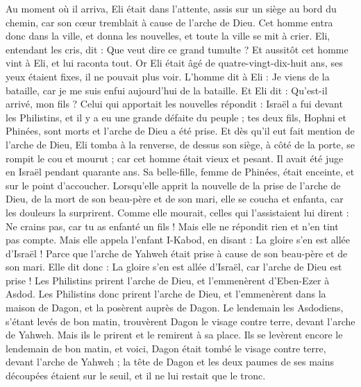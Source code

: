 \begin{multicols}{2}
Au moment où il arriva, Eli était dans l’attente, assis sur un siège au bord du chemin, car son cœur tremblait à cause de l'arche de Dieu. Cet homme entra donc dans la ville, et donna les nouvelles, et toute la ville se mit à crier.
Eli, entendant les cris, dit : Que veut dire ce grand tumulte ? Et aussitôt cet homme vint à Eli, et lui raconta tout.
Or Eli était âgé de quatre-vingt-dix-huit ans, ses yeux étaient fixes, il ne pouvait plus voir.
L’homme dit à Eli : Je viens de la bataille, car je me suis enfui aujourd'hui de la bataille. Et Eli dit : Qu'est-il arrivé, mon fils ?
Celui qui apportait les nouvelles répondit : Israël a fui devant les Philistins, et il y a eu une grande défaite du peuple ; tes deux fils, Hophni et Phinées, sont morts et l'arche de Dieu a été prise.
Et dès qu'il eut fait mention de l'arche de Dieu, Eli tomba à la renverse, de dessus son siège, à côté de la porte, se rompit le cou et mourut ; car cet homme était vieux et pesant. Il avait été juge en Israël pendant quarante ans.
Sa belle-fille, femme de Phinées, était enceinte, et sur le point d'accoucher. Lorsqu’elle apprit la nouvelle de la prise de l'arche de Dieu, de la mort de son beau-père et de son mari, elle se coucha et enfanta, car les douleurs la surprirent.
Comme elle mourait, celles qui l'assistaient lui dirent : Ne crains pas, car tu as enfanté un fils ! Mais elle ne répondit rien et n'en tint pas compte.
Mais elle appela l'enfant I-Kabod, en disant : La gloire s’en est allée d'Israël ! Parce que l'arche de Yahweh était prise à cause de son beau-père et de son mari.
Elle dit donc : La gloire s’en est allée d'Israël, car l'arche de Dieu est prise !
\VerseOne{}Les Philistins prirent l'arche de Dieu, et l'emmenèrent d'Eben-Ezer à Asdod.
Les Philistins donc prirent l'arche de Dieu, et l'emmenèrent dans la maison de Dagon, et la posèrent auprès de Dagon.
Le lendemain les Asdodiens, s'étant levés de bon matin, trouvèrent Dagon le visage contre terre, devant l'arche de Yahweh. Mais ils le prirent et le remirent à sa place.
Ils se levèrent encore le lendemain de bon matin, et voici, Dagon était tombé le visage contre terre, devant l'arche de Yahweh ; la tête de Dagon et les deux paumes de ses mains découpées étaient sur le seuil, et il ne lui restait que le tronc.

\end{multicols}
